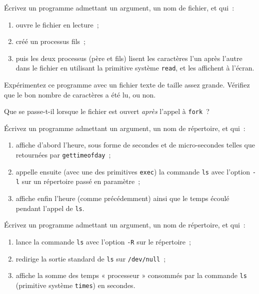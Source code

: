 Écrivez un programme admettant un argument, un nom de fichier, et qui~:
\begin {enumerate}
    \item ouvre le fichier en lecture~;
    \item créé un processus fils~;
    \item puis les deux processus (père et fils) lisent les caractères
	l'un après l'autre dans le fichier en utilisant la primitive système
	{\tt read}, et les affichent à l'écran.
\end {enumerate}
Expérimentez ce programme avec un fichier texte de taille assez grande.
Vérifiez que le bon nombre de caractères a été lu, ou non.

Que se passe-t-il lorsque le fichier est ouvert {\em après} l'appel à
{\tt fork}~?


\question

Écrivez un programme admettant un argument, un nom de répertoire,
et qui~:

\begin {enumerate}
    \item affiche d'abord l'heure, sous forme de secondes et de
	micro-secondes telles que retournées par \texttt {gettimeofday}~;

    \item appelle ensuite (avec une des primitives \texttt {exec})
	la commande \texttt {ls} avec l'option \texttt {-l} sur un
	répertoire passé en paramètre~;

    \item affiche enfin l'heure (comme précédemment) ainsi que le
	temps écoulé pendant l'appel de \texttt {ls}.

\end {enumerate}


\question

Écrivez un programme admettant un argument, un nom de répertoire,
et qui~:

\begin {enumerate}
    \item lance la commande {\tt ls} avec l'option \texttt{-R} sur
	le répertoire~;
    \item redirige la sortie standard de {\tt ls} sur {\tt /dev/null}~;
    \item affiche la somme des temps « processeur »
	consommés par la commande {\tt ls} (primitive système {\tt times})
	en secondes.
\end {enumerate}


\question

